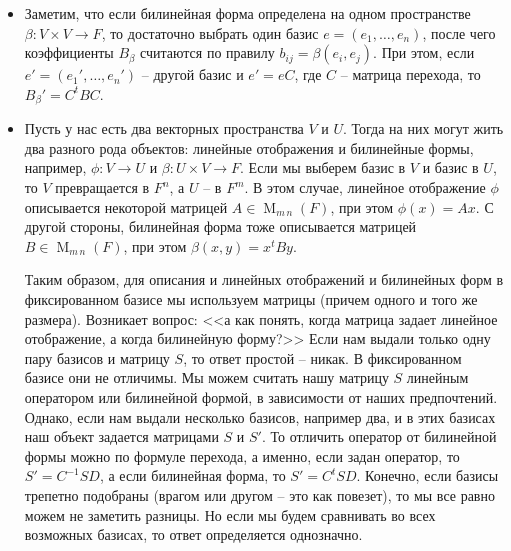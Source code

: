 \begin{itemize}
\item Заметим, что если билинейная форма определена на одном пространстве $\beta\colon V\times V\to F$, то достаточно выбрать один базис $e=(e_1,\ldots,e_n)$, после чего коэффициенты $B_\beta$ считаются по правилу $b_{ij} = \beta(e_i,e_j)$.
При этом, если $e'=(e_1',\ldots,e_n')$ -- другой базис и $e'=eC$, где $C$ -- матрица перехода, то $B_\beta' = C^t B C$.

\item Пусть у нас есть два векторных пространства $V$ и $U$.
Тогда на них могут жить два разного рода объектов: линейные отображения и билинейные формы, например, $\phi\colon V\to U$ и $\beta\colon U\times V \to F$.
Если мы выберем базис в $V$ и базис в $U$, то $V$ превращается в $F^n$, а $U$ -- в $F^m$.
В этом случае, линейное отображение $\phi$ описывается некоторой матрицей $A\in\operatorname{M}_{m\,n}(F)$, при этом $\phi(x) = Ax$.
С другой стороны, билинейная форма тоже описывается матрицей $B\in \operatorname{M}_{m\,n}(F)$, при этом $\beta(x,y) = x^tBy$.

Таким образом, для описания и линейных отображений и билинейных форм в фиксированном базисе мы используем матрицы (причем одного и того же размера).
Возникает вопрос: <<а как понять,  когда матрица задает линейное отображение, а когда билинейную форму?>> Если  нам выдали только одну пару базисов и матрицу $S$, то ответ простой -- никак.
В фиксированном базисе они не отличимы.
Мы можем считать нашу матрицу $S$ линейным оператором или билинейной формой, в зависимости от наших предпочтений.
Однако, если нам выдали несколько базисов, например два, и в этих базисах наш объект задается матрицами $S$ и $S'$.
То отличить оператор от билинейной формы можно по формуле перехода, а именно, если задан оператор, то $S' = C^{-1}S D$, а если билинейная форма, то $S' = C^t S D$.
Конечно, если базисы трепетно подобраны (врагом или другом -- это как повезет), то мы все равно можем не заметить разницы.
Но если мы будем сравнивать во всех возможных базисах, то ответ определяется однозначно.
\end{itemize}

